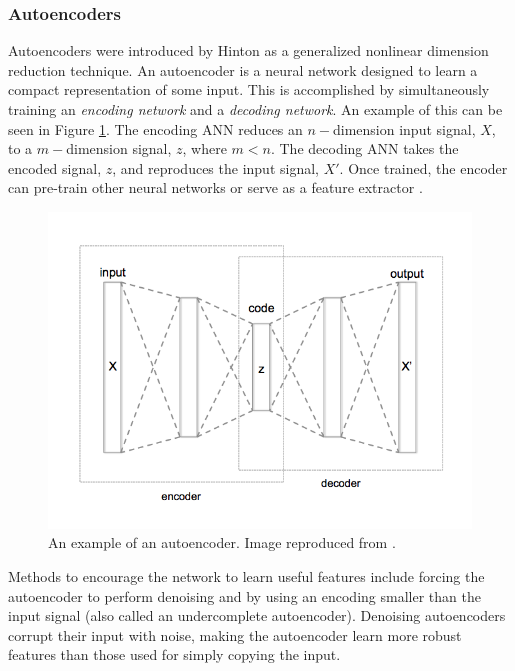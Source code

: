 \subsubsection{Autoencoders} \label{Autoencoders}

Autoencoders were introduced by Hinton \cite{Hinton2006} as a generalized nonlinear dimension reduction technique. An autoencoder is a neural network designed to learn a compact representation of some input. This is accomplished by simultaneously training an \textit{encoding network} and a \textit{decoding network}. An example of this can be seen in Figure \ref{fig:Autoencoder_structure}. The encoding ANN reduces an $n-$dimension input signal, $X$, to a $m-$dimension signal, $z$, where $m < n$. The decoding ANN takes the encoded signal, $z$, and reproduces the input signal, $X'$. Once trained, the encoder can pre-train other neural networks or serve as a feature extractor \cite{Erhan2010,CHARTE2018}. 

\begin{figure}[H]
	\centering
	\includegraphics[width=0.8\linewidth]{images/Autoencoder_structure}
	\caption{An example of an autoencoder. Image reproduced from \cite{wiki:AutoencoderStructure}.}
	\label{fig:Autoencoder_structure}
\end{figure}

Methods to encourage the network to learn useful features include forcing the autoencoder to perform denoising \cite{Vincent2008, Vincent2010} and by using an encoding smaller than the input signal (also called an undercomplete autoencoder). Denoising autoencoders corrupt their input with noise, making the autoencoder learn more robust features than those used for simply copying the input. 

